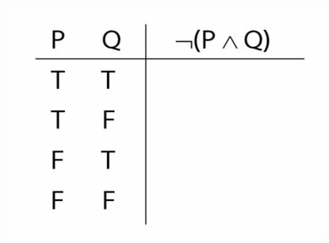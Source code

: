\documentclass[12pt]{extarticle}
\begin{document}
\begin{multicols*}{3}
\begin{center}
\includegraphics[scale=0.3]{img/unit_60_tt.png}
\end{center}
\vfill
% 
% 
% 
% 
% 
% 
% 
% 
% 
 


\end{multicols*}
\end{document}
